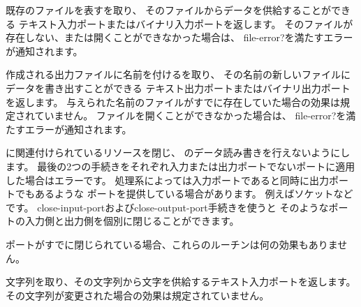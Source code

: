 \begin{entry}{%
}
 
既存のファイルを表すを取り、
そのファイルからデータを供給することができる
テキスト入力ポートまたはバイナリ入力ポートを返します。
そのファイルが存在しない、または開くことができなかった場合は、
{\cf file-error?}を満たすエラーが通知されます。

\end{entry}


\begin{entry}{%
}

作成される出力ファイルに名前を付けるを取り、
その名前の新しいファイルにデータを書き出すことができる
テキスト出力ポートまたはバイナリ出力ポートを返します。
与えられた名前のファイルがすでに存在していた場合の効果は規定されていません。
ファイルを開くことができなかった場合は、
{\cf file-error?}を満たすエラーが通知されます。

\end{entry}


\begin{entry}{%
}

に関連付けられているリソースを閉じ、
のデータ読み書きを行えないようにします。
最後の2つの手続きをそれぞれ入力または出力ポートでないポートに適用した場合はエラーです。
処理系によっては入力ポートであると同時に出力ポートでもあるような
ポートを提供している場合があります。
例えばソケットなどです。
{\cf close-input-port}および{\cf close-output-port}手続きを使うと
そのようなポートの入力側と出力側を個別に閉じることができます。

ポートがすでに閉じられている場合、これらのルーチンは何の効果もありません。


\end{entry}

\begin{entry}{%
}

文字列を取り、その文字列から文字を供給するテキスト入力ポートを返します。
その文字列が変更された場合の効果は規定されていません。

\end{entry}

